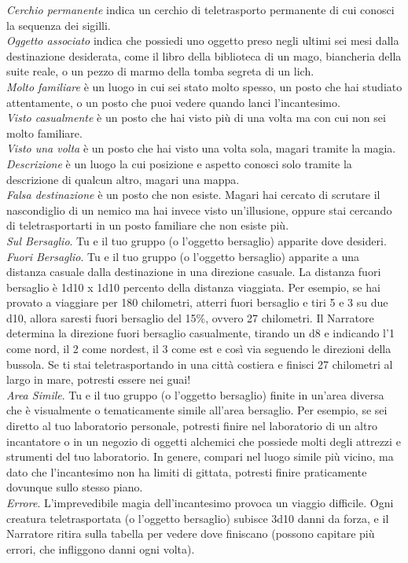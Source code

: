 \begin{multicols}{2}

\textit{Cerchio permanente} indica un cerchio di teletrasporto permanente di cui conosci la sequenza dei sigilli.\\
\textit{Oggetto associato} indica che possiedi uno oggetto preso negli ultimi sei mesi dalla destinazione desiderata, come il libro della biblioteca di un mago, biancheria della suite reale, o un pezzo di marmo della tomba segreta di un lich.\\
\textit{Molto familiare} è un luogo in cui sei stato molto spesso, un posto che hai studiato attentamente, o un posto che puoi vedere quando lanci l'incantesimo.\\
\textit{Visto casualmente} è un posto che hai visto più di una volta ma con cui non sei molto familiare. \\
\textit{Visto una volta} è un posto che hai visto una volta sola, magari tramite la magia.\\ \textit{Descrizione} è un luogo la cui posizione e aspetto conosci solo tramite la descrizione di qualcun altro, magari una mappa.\\
\textit{Falsa destinazione} è un posto che non esiste. Magari hai cercato di scrutare il nascondiglio di un nemico ma hai invece visto un'illusione, oppure stai cercando di teletrasportarti in un posto familiare che non esiste più. \\
\textit{Sul Bersaglio}. Tu e il tuo gruppo (o l'oggetto bersaglio) apparite dove desideri.\\
\textit{Fuori Bersaglio}. Tu e il tuo gruppo (o l'oggetto bersaglio) apparite a una distanza casuale dalla destinazione in una direzione casuale. La distanza fuori bersaglio è 1d10 x 1d10 percento della distanza viaggiata. Per esempio, se hai provato a viaggiare per 180 chilometri, atterri fuori bersaglio e tiri 5 e 3 su due d10, allora saresti fuori bersaglio del 15\%, ovvero 27 chilometri. Il Narratore determina la direzione fuori bersaglio casualmente, tirando un d8 e indicando l'1 come nord, il 2 come nordest, il 3 come est e così via seguendo le direzioni della bussola. Se ti stai teletrasportando in una città costiera e finisci 27 chilometri al largo in mare, potresti essere nei guai!\\
\textit{Area Simile}. Tu e il tuo gruppo (o l'oggetto bersaglio) finite in un'area diversa che è visualmente o tematicamente simile all'area bersaglio. Per esempio, se sei diretto al tuo laboratorio personale, potresti finire nel laboratorio di un altro incantatore o in un negozio di oggetti alchemici che possiede molti degli attrezzi e strumenti del tuo laboratorio. In genere, compari nel luogo simile più vicino, ma dato che l'incantesimo non ha limiti di gittata, potresti finire praticamente dovunque sullo stesso piano.\\
\textit{Errore}. L'imprevedibile magia dell'incantesimo provoca un viaggio difficile. Ogni creatura teletrasportata (o l'oggetto bersaglio) subisce 3d10 danni da forza, e il Narratore ritira sulla tabella per vedere dove finiscano (possono capitare più errori, che infliggono danni ogni
volta).


\end{multicols}
